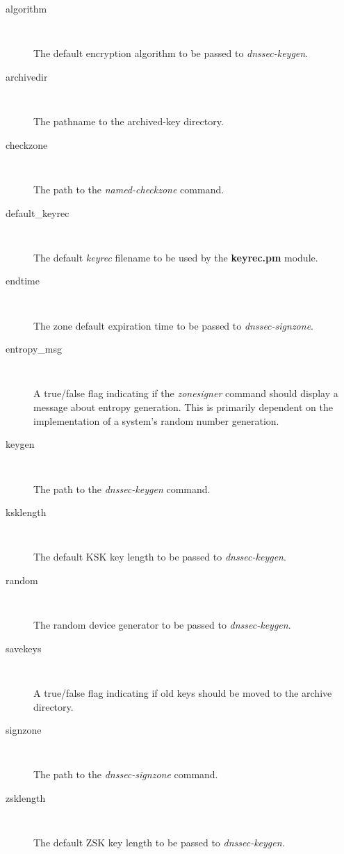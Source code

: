 \begin{description}

\item [algorithm]\verb" "

The default encryption algorithm to be passed to {\it dnssec-keygen}.

\item [archivedir]\verb" "

The pathname to the archived-key directory.

\item [checkzone]\verb" "

The path to the {\it named-checkzone} command.

\item [default\_keyrec]\verb" "

The default {\it keyrec} filename to be used by the {\bf keyrec.pm} module.

\item [endtime]\verb" "

The zone default expiration time to be passed to {\it dnssec-signzone}.

\item [entropy\_msg]\verb" "

A true/false flag indicating if the {\it zonesigner} command should display
a message about entropy generation.  This is primarily dependent on the
implementation of a system's random number generation.

\item [keygen]\verb" "

The path to the {\it dnssec-keygen} command.

\item [ksklength]\verb" "

The default KSK key length to be passed to {\it dnssec-keygen}.

\item [random]\verb" "

The random device generator to be passed to {\it dnssec-keygen}.

\item [savekeys]\verb" "

A true/false flag indicating if old keys should be moved to the
archive directory.

\item [signzone]\verb" "

The path to the {\it dnssec-signzone} command.

\item [zsklength]\verb" "

The default ZSK key length to be passed to {\it dnssec-keygen}.

\end{description}

